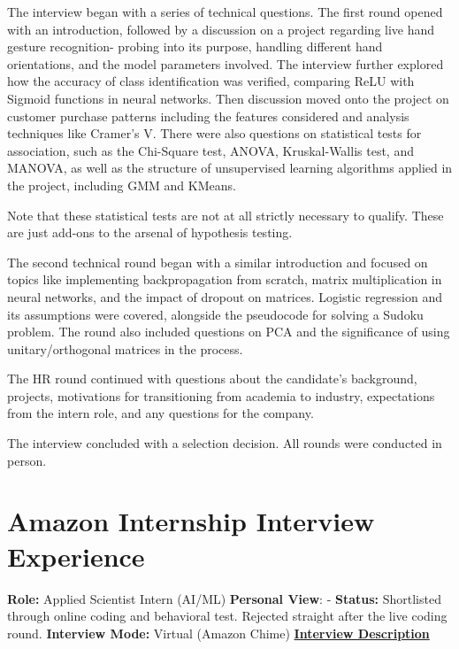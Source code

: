\documentclass[12pt]{article}
\begin{document}
The interview began with a series of technical questions. The first round opened with an introduction, followed by a discussion on a project regarding live hand gesture recognition-  probing into its purpose, handling different hand orientations, and the model parameters involved. The interview further explored how the accuracy of class identification was verified, comparing ReLU with Sigmoid functions in neural networks. 
Then discussion moved onto the project on customer purchase patterns including the features considered and analysis techniques like Cramer's V. There were also questions on statistical tests for association, such as the Chi-Square test, ANOVA, Kruskal-Wallis test, and MANOVA, as well as the structure of unsupervised learning algorithms applied in the project, including GMM and KMeans.

Note that these statistical tests are not at all strictly necessary to qualify. These are just add-ons to the arsenal of hypothesis testing.

The second technical round began with a similar introduction and focused on topics like implementing backpropagation from scratch, matrix multiplication in neural networks, and the impact of dropout on matrices. Logistic regression and its assumptions were covered, alongside the pseudocode for solving a Sudoku problem. The round also included questions on PCA and the significance of using unitary/orthogonal matrices in the process.

The HR round continued with questions about the candidate's background, projects, motivations for transitioning from academia to industry, expectations from the intern role, and any questions for the company. 

The interview concluded with a selection decision. All rounds were conducted in person.

\section{Amazon Internship Interview Experience}

\textbf{Role:} Applied Scientist Intern (AI/ML)
\newline
\textbf{Personal View}: -
\newline
\textbf{Status:} Shortlisted through online coding and behavioral test. Rejected straight after the live coding round.
\newline
\textbf{Interview Mode:} Virtual (Amazon Chime)
\vspace{10pt}
\newline
\underline{\textbf{Interview Description}}
\newline
\end{document}
